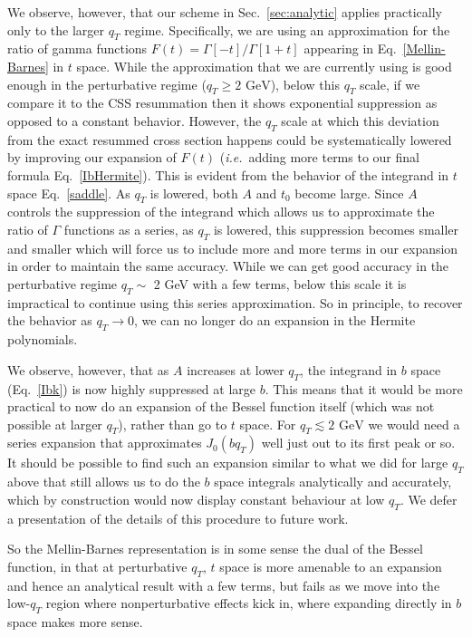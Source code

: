 \documentclass[a4,letterpaper,11pt]{article}
\newcommand{\ie}{\emph{i.e.}~}
\newcommand{\eq}[1]{Eq.~\eqref{#1}}
\renewcommand{\sec}[1]{Sec.~\ref{sec:#1}}
\begin{document}
We observe, however, that our scheme in \sec{analytic} applies practically only to the larger $q_T$ regime. Specifically, we are using an approximation for the ratio of gamma functions $F(t) = \Gamma[-t]/\Gamma[1+t]$ appearing in \eq{Mellin-Barnes} in $t$ space.
While the approximation that we are currently using is good enough in the perturbative regime ($q_T \geq 2\text{ GeV}$), below this $q_T$ scale, if we compare it to the CSS resummation then it shows exponential suppression as opposed to a constant behavior.
However, the $q_T$ scale at which this deviation from the exact resummed cross section happens could be systematically lowered by improving our expansion of $F(t)$ (\ie adding more terms to our final formula \eq{IbHermite}).
This is evident from the behavior of the integrand in $t$ space \eq{saddle}. As $q_T$ is lowered, both $A$ and $t_0$ become large. Since $A$ controls the suppression of the integrand which allows us to approximate the ratio of $\Gamma$ functions as a series, as $q_T$ is lowered, this suppression becomes smaller and smaller which will force us to include more and more terms in our expansion in order to maintain the same accuracy. While we can get good accuracy in the perturbative regime $q_T \sim $ 2 GeV with a few terms, below this scale it is impractical to continue using this series approximation. So in principle, to recover the behavior as $q_T\to 0$, we can no longer do an expansion in the Hermite polynomials.

We observe, however, that as $A$ increases at lower $q_T$, the integrand in $b$ space (\eq{Ibk}) is now highly suppressed at large $b$. This means that it would be more practical to now do an expansion of the Bessel function itself (which was not possible at larger $q_T$), rather than go to $t$ space. For $q_T\lesssim 2\text{ GeV}$ we would need a series expansion that approximates $J_0(bq_T)$ well just out to its first peak or so. It should be possible to find such an expansion similar to what we did for large $q_T$ above that still allows us to do the $b$ space integrals analytically and accurately, which by construction would now display constant behaviour at low $q_T$. We defer a presentation of the details of this procedure to future work. 

So the Mellin-Barnes representation is in some sense the dual of the Bessel function, in that at perturbative $q_T$, $t$ space is more amenable to an expansion and hence an analytical result with a few terms, but fails as we move into the low-$q_T$ region where nonperturbative effects kick in, where expanding directly in $b$ space makes more sense. 
\end{document}
